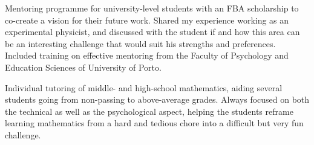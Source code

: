 
\begin{cventries}

    {}
    {}
    {}
    {Mentoring programme for university-level students with an FBA scholarship to co-create a vision for their future work. Shared my experience working as an experimental physicist, and discussed with the student if and how this area can be an interesting challenge that would suit his strengths and preferences. Included training on effective mentoring from the Faculty of Psychology and Education Sciences of University of Porto.}

    {}
    {}
    {}
    {Individual tutoring of middle- and high-school mathematics, aiding several students going from non-passing to above-average grades. Always focused on both the technical as well as the psychological aspect, helping the students reframe learning mathematics from a hard and tedious chore into a difficult but very fun challenge.}
\end{cventries}